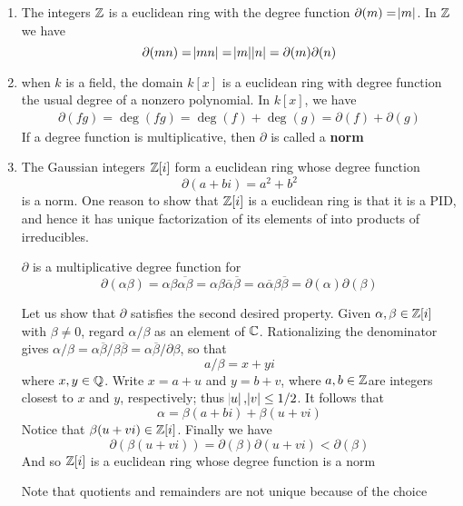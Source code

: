 \documentclass[11pt]{article}
\begin{document}
\begin{examplle}[]
\begin{enumerate}
\item The integers \(\mathbb{Z}\) is a euclidean ring with the degree function
\(\partial(m)=\abs{m}\). In \(\mathbb{Z}\) we have
\begin{equation*}
\partial(mn)=\abs{mn}=\abs{m}\abs{n}=\partial(m)\partial(n)
\end{equation*}
\item when \(k\) is a field, the domain \(k[x]\) is a euclidean ring with degree
function the usual degree of a nonzero polynomial. In \(k[x]\), we have
\begin{align*}
\partial(fg)=\deg(fg)=\deg(f)+\deg(g)=\partial(f)+\partial(g)
\end{align*}
If a degree function is multiplicative, then \(\partial\) is called a \textbf{norm}
\item The Gaussian integers \(\mathbb{Z}[i]\) form a euclidean ring whose degree
function 
\begin{equation*}
\partial(a+bi)=a^2+b^2
\end{equation*}
is a norm. One reason to show that \(\mathbb{Z}[i]\) is a euclidean ring is that
it is a PID, and hence it has unique factorization of its elements of into
products of irreducibles.

\(\partial\) is a multiplicative degree function for 
\begin{equation*}
\partial(\alpha\beta)=\alpha\beta\overline{\alpha\beta}=\alpha\beta\overline{\alpha}
\overline{\beta}=\alpha\overline{\alpha}\beta\overline{\beta}= \partial(\alpha)\partial(\beta)
\end{equation*}

Let us show that \(\partial\) satisfies the second desired property. Given
\(\alpha,\beta\in\mathbb{Z}[i]\) with \(\beta\neq0\), regard \(\alpha/\beta\) as an
element of \(\mathbb{C}\). Rationalizing the denominator gives
\(\alpha/\beta=\alpha\overline{\beta}/\beta\overline{\beta}=\alpha
      \overline{\beta}/\partial{\beta}\), so that
\begin{equation*}
a/\beta=x+yi
\end{equation*}
where \(x,y\in\mathbb{Q}\). Write \(x=a+u\) and \(y=b+v\), where \(a,b\in\mathbb{Z}\)are
integers closest to \(x\) and \(y\), respectively; thus
\(\abs{u},\abs{v}\le1/2\). It follows that
\begin{equation*}
\alpha=\beta(a+bi)+\beta(u+vi)
\end{equation*}
Notice that \(\beta(u+vi)\in\mathbb{Z}[i]\). Finally we have
\begin{equation*}
\partial(\beta(u+vi))=\partial(\beta)\partial(u+vi)<\partial(\beta)
\end{equation*}
And so \(\mathbb{Z}[i]\) is a euclidean ring whose degree function is a norm

Note that quotients and remainders are not unique because of the choice
\end{enumerate}
\end{examplle}
\end{document}

